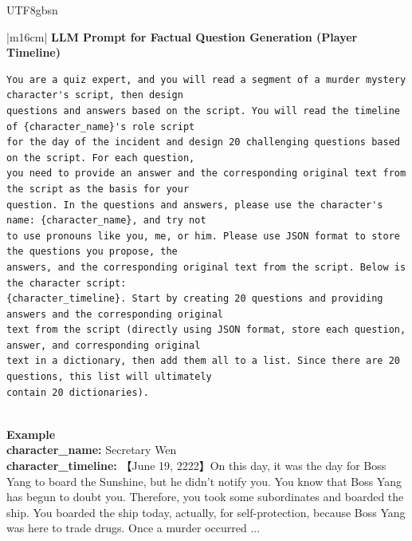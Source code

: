 \documentclass[11pt]{article}
\begin{document}
{\begin{CJK}{UTF8}{gbsn}
\begin{table}[ht!]
\begin{minipage}[t]{\linewidth}
\begin{tabular}{|m{16cm}|}
\hline
{}  {\textbf{LLM Prompt for Factual Question Generation (Player Timeline)}} \\
\begin{minipage}[t]{\linewidth}
\small\begin{verbatim}
You are a quiz expert, and you will read a segment of a murder mystery character's script, then design
questions and answers based on the script. You will read the timeline of {character_name}'s role script
for the day of the incident and design 20 challenging questions based on the script. For each question,
you need to provide an answer and the corresponding original text from the script as the basis for your
question. In the questions and answers, please use the character's name: {character_name}, and try not
to use pronouns like you, me, or him. Please use JSON format to store the questions you propose, the
answers, and the corresponding original text from the script. Below is the character script: 
{character_timeline}. Start by creating 20 questions and providing answers and the corresponding original
text from the script (directly using JSON format, store each question, answer, and corresponding original
text in a dictionary, then add them all to a list. Since there are 20 questions, this list will ultimately
contain 20 dictionaries).
\end{verbatim}
\end{minipage} \\
\hline
{}  \textbf{Example}  \\
 \textbf{  character\_name:} \small Secretary Wen\\
  \textbf{  character\_timeline:} \small 【June 19, 2222】On this day, it was the day for Boss Yang to board the Sunshine, but he didn't notify you. You know that Boss Yang has begun to doubt you. Therefore, you took some subordinates and boarded the ship. You boarded the ship today, actually, for self-protection, because Boss Yang was here to trade drugs. Once a murder occurred ...\\


\hline

\hline


\end{tabular}
\end{minipage}
\end{table}
\end{CJK}}
\end{document}
